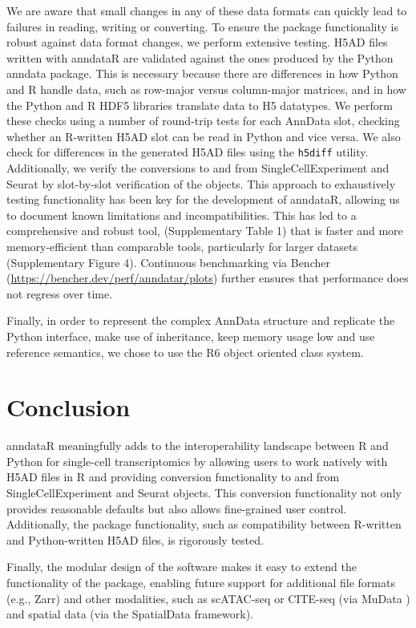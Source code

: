 \documentclass[unnumsec,webpdf,modern,large,namedate]{oup-authoring-template}%
\begin{document}
We are aware that small changes in any of these data formats can quickly lead to failures
in reading, writing or converting. To ensure the package functionality is robust against 
data format changes, we perform extensive testing. H5AD files written with anndataR are 
validated against the ones produced by the Python anndata package. This is necessary 
because there are differences in how Python and R handle data, such as row-major 
versus column-major matrices, and in how the Python and R HDF5 libraries translate 
data to H5 datatypes. We perform these checks using a number of round-trip tests for 
each AnnData slot, checking whether an R-written H5AD slot can be read in Python and vice 
versa. We also check for differences in the generated H5AD files using the \texttt{h5diff} utility. 
Additionally, we verify the conversions to and from SingleCellExperiment and Seurat by 
slot-by-slot verification of the objects. This approach to exhaustively testing 
functionality has been key for the development of anndataR, allowing us to document known 
limitations and incompatibilities. This has led to a comprehensive and robust tool,
(Supplementary Table 1) that is faster and more memory-efficient than comparable tools, particularly for larger datasets
(Supplementary Figure 4). Continuous benchmarking via Bencher (\url{https://bencher.dev/perf/anndatar/plots}) further ensures that performance does not regress over time.

Finally, in order to represent the complex AnnData structure and replicate the Python 
interface, make use of inheritance, keep memory usage low and use reference semantics, we 
chose to use the R6 object oriented class system.

\section{Conclusion}
anndataR meaningfully adds to the interoperability landscape between R and Python for 
single-cell transcriptomics by allowing users to work natively with H5AD files in R and 
providing conversion functionality to and from SingleCellExperiment and Seurat objects. 
This conversion functionality not only provides reasonable defaults but also allows 
fine-grained user control. Additionally, the package functionality, such as compatibility 
between R-written and Python-written H5AD files, is rigorously tested.

Finally, the modular design of the software makes it easy to extend the functionality of the package, enabling future support for additional file formats (e.g., Zarr) and other modalities, such as scATAC-seq or CITE-seq (via MuData \citep{muon}) and spatial data (via the SpatialData \citep{spatialdata} framework). 
\end{document}
